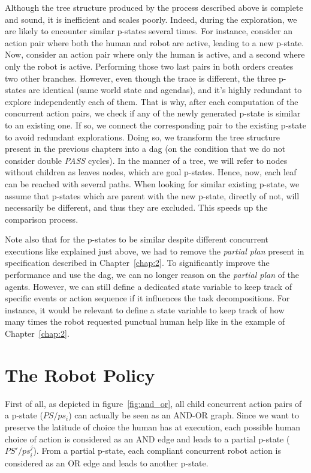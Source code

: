 Although the tree structure produced by the process described above is complete and sound, it is inefficient and scales poorly. Indeed, during the exploration, we are likely to encounter similar p-states several times. For instance, consider an action pair where both the human and robot are active, leading to a new p-state. Now, consider an action pair where only the human is active, and a second where only the robot is active. Performing those two last pairs in both orders creates two other branches. However, even though the trace is different, the three p-states are identical (same world state and agendas), and it's highly redundant to explore independently each of them. That is why, after each computation of the concurrent action pairs, we check if any of the newly generated p-state is similar to an existing one. If so, we connect the corresponding pair to the existing p-state to avoid redundant explorations. Doing so, we transform the tree structure present in the previous chapters into a \acrfull{dag} (on the condition that we do not consider double \textit{PASS} cycles). In the manner of a tree, we will refer to nodes without children as leaves nodes, which are goal p-states. Hence, now, each leaf can be reached with several paths. 
When looking for similar existing p-state, we assume that p-states which are parent with the new p-state, directly of not, will necessarily be different, and thus they are excluded. This speeds up the comparison process. 

Note also that for the p-states to be similar despite different concurrent executions like explained just above, we had to remove the \textit{partial plan} present in specification described in Chapter~\ref{chap:2}. To significantly improve the performance and use the \acrshort{dag}, we can no longer reason on the \textit{partial plan} of the agents. However, we can still define a dedicated state variable to keep track of specific events or action sequence if it influences the task decompositions. For instance, it would be relevant to define a state variable to keep track of how many times the robot requested punctual human help like in the example of Chapter~\ref{chap:2}.    

\section{The Robot Policy}

First of all, as depicted in figure~\ref{fig:and_or}, all child concurrent action pairs of a p-state ($PS / ps_i$) can actually be seen as an AND-OR graph. Since we want to preserve the latitude of choice the human has at execution, each possible human choice of action is considered as an AND edge and leads to a partial p-state ($PS' / ps_i^j$). From a partial p-state, each compliant concurrent robot action is considered as an OR edge and leads to another p-state.

